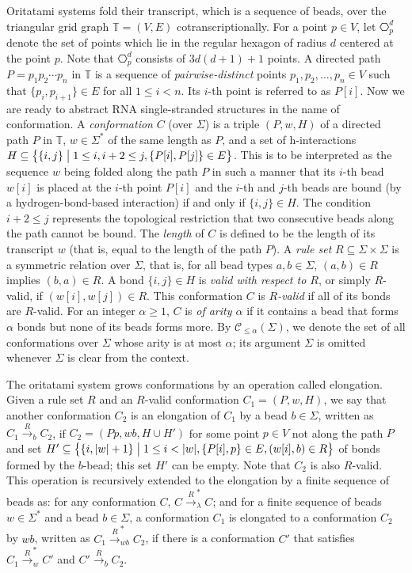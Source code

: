 \documentclass[runningheads]{llncs}
\begin{document}
Oritatami systems fold their transcript, which is a sequence of beads, over the triangular grid graph $\mathbb{T} = (V, E)$ cotranscriptionally. %
For a point $p \in V$, let $\hexagon_p^d$ denote the set of points which lie in the regular hexagon of radius $d$ centered at the point $p$. 
Note that $\hexagon_p^d$ consists of $3d(d+1)+1$ points. %
A directed path $P = p_1 p_2 \cdots p_n$ in $\mathbb{T}$ is a sequence of \textit{pairwise-distinct} points $p_1, p_2, \ldots, p_n \in V$ such that $\{p_i, p_{i+1}\} \in E$ for all $1 \le i < n$. 
Its $i$-th point is referred to as $P[i]$. 
Now we are ready to abstract RNA single-stranded structures in the name of conformation. 
A \textit{conformation} $C$ (over $\Sigma$) is a triple $(P, w, H)$ of a directed path $P$ in $\mathbb{T}$, $w \in \Sigma^*$ of the same length as $P$, and a set of h-interactions $H \subseteq \bigl\{\{i, j\} \bigm| 1 \le i, i+2 \le j, \{P[i], P[j]\} \in E \bigr\}$. 
This is to be interpreted as the sequence $w$ being folded along the path $P$ in such a manner that its $i$-th bead $w[i]$ is placed at the $i$-th point $P[i]$ and the $i$-th and $j$-th beads are bound (by a hydrogen-bond-based interaction) if and only if $\{i, j\} \in H$. 
The condition $i+2 \le j$ represents the topological restriction that two consecutive beads along the path cannot be bound. 
The \textit{length} of $C$ is defined to be the length of its transcript $w$ (that is, equal to the length of the path $P$). 
A \textit{rule set} $R \subseteq \Sigma \times \Sigma$ is a symmetric relation over $\Sigma$, that is, for all bead types $a, b \in \Sigma$, $(a, b) \in R$ implies $(b, a) \in R$.
A bond $\{i, j\} \in H$ is \textit{valid with respect to $R$}, or simply $R$-valid, if $(w[i], w[j]) \in R$. 
This conformation $C$ is \textit{$R$-valid} if all of its bonds are $R$-valid. %
For an integer $\alpha \ge 1$, $C$ is \textit{of arity $\alpha$} if it contains a bead that forms $\alpha$ bonds but none of its beads forms more. 
By $\mathcal{C}_{\le \alpha}(\Sigma)$, we denote the set of all conformations over $\Sigma$ whose arity is at most $\alpha$; its argument $\Sigma$ is omitted whenever $\Sigma$ is clear from the context. 

The oritatami system grows conformations by an operation called elongation. 
Given a rule set $R$ and an $R$-valid conformation $C_1 = (P, w, H)$, we say that another conformation $C_2$ is an elongation of $C_1$ by a bead $b \in \Sigma$, written as $C_1 \xrightarrow{R}_b C_2$, if $C_2 = (P p, wb, H \cup H')$ for some point $p \in V$ not along the path $P$ and set $H' \subseteq \bigl\{ \{i, |w|+1\} \bigm| 1 \le i < |w|, \{P[i], p\} \in E, (w[i], b) \in R \bigr\}$ of bonds formed by the $b$-bead; this set $H'$ can be empty. 
Note that $C_2$ is also $R$-valid. 
This operation is recursively extended to the elongation by a finite sequence of beads as: for any conformation $C$, $C \xrightarrow{R}_\lambda^* C$; and for a finite sequence of beads $w \in \Sigma^*$ and a bead $b \in \Sigma$, a conformation $C_1$ is elongated to a conformation $C_2$ by $wb$, written as $C_1 \xrightarrow{R}_{wb}^* C_2$, if there is a conformation $C'$ that satisfies $C_1 \xrightarrow{R}_w^* C'$ and $C' \xrightarrow{R}_b C_2$. 
\end{document}
